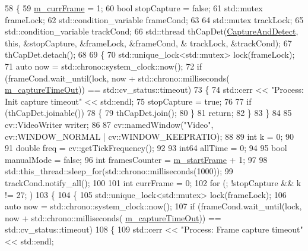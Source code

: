 \begin{DoxyCode}
58 \{
59     \mbox{\hyperlink{class_video_example_a4adccbe4084f68f10d966901b168a98a}{m\_currFrame}} = 1;
60     \textcolor{keywordtype}{bool} stopCapture = \textcolor{keyword}{false};
61     std::mutex frameLock;
62     std::condition\_variable frameCond;
63 
64     std::mutex trackLock;
65     std::condition\_variable trackCond;
66     std::thread thCapDet(\mbox{\hyperlink{class_video_example_ace8617201da40b6e230bd6c049b48aa0}{CaptureAndDetect}}, \textcolor{keyword}{this}, &stopCapture, &frameLock, &frameCond, &
      trackLock, &trackCond);
67     thCapDet.detach();
68 
69     \{
70         std::unique\_lock<std::mutex> lock(frameLock);
71         \textcolor{keyword}{auto} now = std::chrono::system\_clock::now();
72         \textcolor{keywordflow}{if} (frameCond.wait\_until(lock, now + std::chrono::milliseconds(
      \mbox{\hyperlink{class_video_example_aea3c9dd66a3464fab8c61a838aff0ccf}{m\_captureTimeOut}})) == std::cv\_status::timeout)
73         \{
74             std::cerr << \textcolor{stringliteral}{"Process: Init capture timeout"} << std::endl;
75             stopCapture = \textcolor{keyword}{true};
76 
77             \textcolor{keywordflow}{if} (thCapDet.joinable())
78             \{
79                 thCapDet.join();
80             \}
81             \textcolor{keywordflow}{return};
82         \}
83     \}
84 
85     cv::VideoWriter writer;
86 
87     cv::namedWindow(\textcolor{stringliteral}{"Video"}, cv::WINDOW\_NORMAL | cv::WINDOW\_KEEPRATIO);
88 
89     \textcolor{keywordtype}{int} k = 0;
90 
91     \textcolor{keywordtype}{double} freq = cv::getTickFrequency();
92 
93     int64 allTime = 0;
94 
95     \textcolor{keywordtype}{bool} manualMode = \textcolor{keyword}{false};
96     \textcolor{keywordtype}{int} framesCounter = \mbox{\hyperlink{class_video_example_a98dbe94b8827c5a1898e3a9423cce402}{m\_startFrame}} + 1;
97 
98     std::this\_thread::sleep\_for(std::chrono::milliseconds(1000));
99     trackCond.notify\_all();
100 
101     \textcolor{keywordtype}{int} currFrame = 0;
102     \textcolor{keywordflow}{for} (; !stopCapture && k != 27; )
103     \{
104         \{
105             std::unique\_lock<std::mutex> lock(frameLock);
106             \textcolor{keyword}{auto} now = std::chrono::system\_clock::now();
107             \textcolor{keywordflow}{if} (frameCond.wait\_until(lock, now + std::chrono::milliseconds(
      \mbox{\hyperlink{class_video_example_aea3c9dd66a3464fab8c61a838aff0ccf}{m\_captureTimeOut}})) == std::cv\_status::timeout)
108             \{
109                 std::cerr << \textcolor{stringliteral}{"Process: Frame capture timeout"} << std::endl;

\end{DoxyCode}
